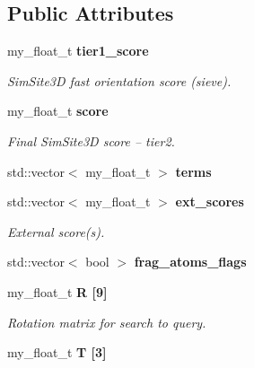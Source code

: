 \subsection*{Public Attributes}
\begin{CompactItemize}
\item 
my\_\-float\_\-t \bf{tier1\_\-score}\label{classSimSite3D_1_1rigid__align__t_1fef21d1eb205408a96f533891e79557}

\begin{CompactList}\small\item\em SimSite3D fast orientation score (sieve). \item\end{CompactList}\item 
my\_\-float\_\-t \bf{score}\label{classSimSite3D_1_1rigid__align__t_90a54e487c78c50e21dcb7f781cc37ef}

\begin{CompactList}\small\item\em Final SimSite3D score -- tier2. \item\end{CompactList}\item 
std::vector$<$ my\_\-float\_\-t $>$ \textbf{terms}\label{classSimSite3D_1_1rigid__align__t_6cf98bc92eac939ebe592ae47a49446a}

\item 
std::vector$<$ my\_\-float\_\-t $>$ \bf{ext\_\-scores}\label{classSimSite3D_1_1rigid__align__t_0ce6360ea3d61818cd088f34f2cf118d}

\begin{CompactList}\small\item\em External score(s). \item\end{CompactList}\item 
std::vector$<$ bool $>$ \textbf{frag\_\-atoms\_\-flags}\label{classSimSite3D_1_1rigid__align__t_8a3efbcef870f53faa51a54e64918e17}

\item 
my\_\-float\_\-t \bf{R} [9]\label{classSimSite3D_1_1rigid__align__t_c19150913ee8369262f89abf3dba1839}

\begin{CompactList}\small\item\em Rotation matrix for search to query. \item\end{CompactList}\item 
my\_\-float\_\-t \bf{T} [3]\label{classSimSite3D_1_1rigid__align__t_c66d5098258a0e0296c47b3d438dfd40}


\end{CompactItemize}
